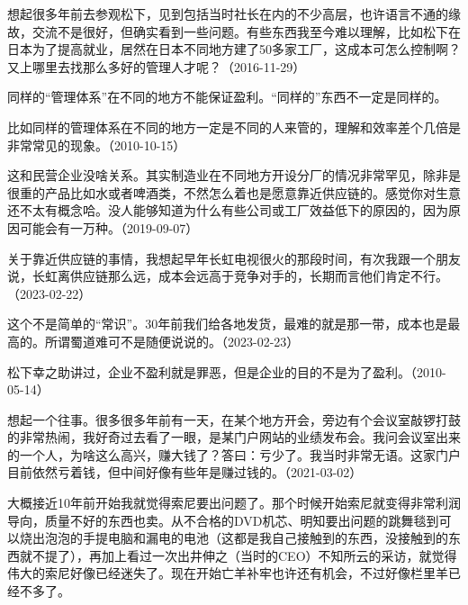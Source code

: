 想起很多年前去参观松下，见到包括当时社长在内的不少高层，也许语言不通的缘故，交流不是很好，但确实看到一些问题。有些东西我至今难以理解，比如松下在日本为了提高就业，居然在日本不同地方建了50多家工厂，这成本可怎么控制啊？又上哪里去找那么多好的管理人才呢？（2016-11-29）


同样的“管理体系”在不同的地方不能保证盈利。“同样的”东西不一定是同样的。


比如同样的管理体系在不同的地方一定是不同的人来管的，理解和效率差个几倍是非常常见的现象。（2010-10-15）


这和民营企业没啥关系。其实制造业在不同地方开设分厂的情况非常罕见，除非是很重的产品比如水或者啤酒类，不然怎么着也是愿意靠近供应链的。感觉你对生意还不太有概念哈。没人能够知道为什么有些公司或工厂效益低下的原因的，因为原因可能会有一万种。（2019-09-07）

关于靠近供应链的事情，我想起早年长虹电视很火的那段时间，有次我跟一个朋友说，长虹离供应链那么远，成本会远高于竞争对手的，长期而言他们肯定不行。（2023-02-22）


这个不是简单的“常识”。30年前我们给各地发货，最难的就是那一带，成本也是最高的。所谓蜀道难可不是随便说说的。（2023-02-23）


松下幸之助讲过，企业不盈利就是罪恶，但是企业的目的不是为了盈利。（2010-05-14）

想起一个往事。很多很多年前有一天，在某个地方开会，旁边有个会议室敲锣打鼓的非常热闹，我好奇过去看了一眼，是某门户网站的业绩发布会。我问会议室出来的一个人，为啥这么高兴，赚大钱了？答曰：亏少了。我当时非常无语。这家门户目前依然亏着钱，但中间好像有些年是赚过钱的。（2021-03-02）



大概接近10年前开始我就觉得索尼要出问题了。那个时候开始索尼就变得非常利润导向，质量不好的东西也卖。从不合格的DVD机芯、明知要出问题的跳舞毯到可以烧出泡泡的手提电脑和漏电的电池（这都是我自己接触到的东西，没接触到的东西就不提了），再加上看过一次出井伸之（当时的CEO）不知所云的采访，就觉得伟大的索尼好像已经迷失了。现在开始亡羊补牢也许还有机会，不过好像栏里羊已经不多了。

